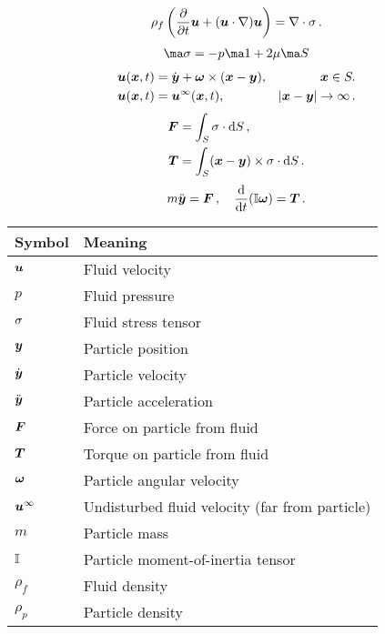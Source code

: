 \documentclass[thesis.tex]{subfiles}
\begin{document}
\begin{align}
    \rho_f \left(\frac{\partial }{\partial t}\mbox{\boldmath$u$} + (\mbox{\boldmath$u$} \cdot \nabla) \mbox{\boldmath$u$}\right)=\nabla \cdot \mathbb{\sigma}\,.
\end{align}
\begin{align}
    \ma \sigma = -p \ma 1 + 2\mu \ma S
\end{align}
\begin{align}
    \mbox{\boldmath$u$}(\mbox{\boldmath$x$}, t) &= \dot{\mbox{\boldmath$y$}} + \mbox{\boldmath$\omega$} \times (\mbox{\boldmath$x$} - \mbox{\boldmath$y$}), & \mbox{\boldmath$x$} \in S. \nonumber\\
    \mbox{\boldmath$u$}(\mbox{\boldmath$x$}, t) &= \mbox{\boldmath$u$}^\infty(\mbox{\boldmath$x$}, t), & |\mbox{\boldmath$x$}-\mbox{\boldmath$y$}|\to\infty\,.
\end{align}
\begin{align}
    \mbox{\boldmath$F$} &= \int_S \mathbb{\sigma} \cdot \mathrm{d} S\,, \\
    \mbox{\boldmath$T$} &= \int_S (\mbox{\boldmath$x$} - \mbox{\boldmath$y$}) \times \mathbb{\sigma} \cdot \mathrm{d} S\,.
\end{align}
\begin{align}
    m\ddot{\mbox{\boldmath$y$}} = \mbox{\boldmath$F$}\,, \quad \frac{\mathrm{d} }{\mathrm{d} t}(\mathbb{I} \mbox{\boldmath$\omega$}) = \mbox{\boldmath$T$}\,.
\end{align}

\begin{table}
    \begin{tabular}{ll}
    \toprule
    Symbol & Meaning \\
    \midrule
    $\mbox{\boldmath$u$}$      & Fluid velocity       \\
    $p$      & Fluid pressure       \\
    $\mathbb{\sigma}$      & Fluid stress tensor       \\
    $\mbox{\boldmath$y$}$      & Particle position       \\
    $\dot{\mbox{\boldmath$y$}}$      & Particle velocity       \\
    $\ddot{\mbox{\boldmath$y$}}$      & Particle acceleration       \\
    $\mbox{\boldmath$F$}$      & Force on particle from fluid       \\
    $\mbox{\boldmath$T$}$      & Torque on particle from fluid       \\
    $\mbox{\boldmath$\omega$}$      & Particle angular velocity       \\
    $\mbox{\boldmath$u$}^\infty$      & Undisturbed fluid velocity (far from particle)       \\
    $m$      & Particle mass       \\
    $\mathbb{I}$ & Particle moment-of-inertia tensor \\
    $\rho_f$      & Fluid density       \\
    $\rho_p$      & Particle density       \\
    \bottomrule
    \end{tabular}
\end{table}
\end{document}

